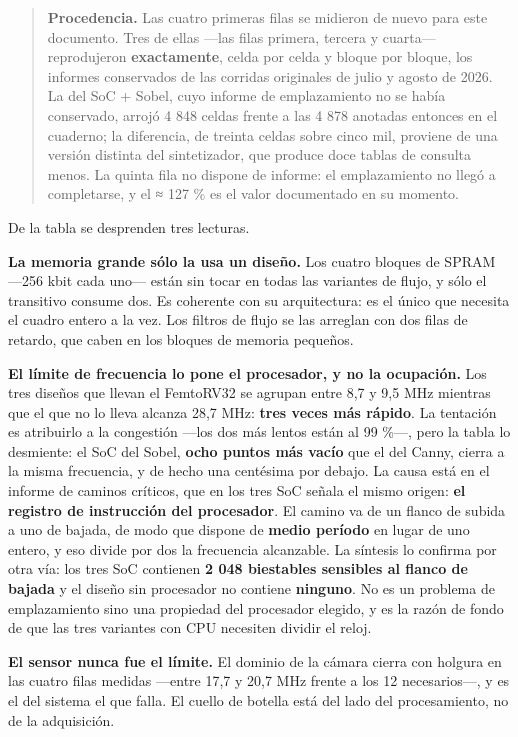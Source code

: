 \begin{quote}
\textbf{Procedencia.} Las cuatro primeras filas se midieron de nuevo
para este documento. Tres de ellas ---las filas primera, tercera y
cuarta--- reprodujeron \textbf{exactamente}, celda por celda y bloque
por bloque, los informes conservados de las corridas originales de julio
y agosto de 2026. La del SoC + Sobel, cuyo informe de emplazamiento no
se había conservado, arrojó 4 848 celdas frente a las 4 878 anotadas
entonces en el cuaderno; la diferencia, de treinta celdas sobre cinco
mil, proviene de una versión distinta del sintetizador, que produce doce
tablas de consulta menos. La quinta fila no dispone de informe: el
emplazamiento no llegó a completarse, y el ≈ 127 \% es el valor
documentado en su momento.
\end{quote}

De la tabla se desprenden tres lecturas.

\textbf{La memoria grande sólo la usa un diseño.} Los cuatro bloques de
SPRAM ---256 kbit cada uno--- están sin tocar en todas las variantes de
flujo, y sólo el transitivo consume dos. Es coherente con su
arquitectura: es el único que necesita el cuadro entero a la vez. Los
filtros de flujo se las arreglan con dos filas de retardo, que caben en
los bloques de memoria pequeños.

\textbf{El límite de frecuencia lo pone el procesador, y no la
ocupación.} Los tres diseños que llevan el FemtoRV32 se agrupan entre
8,7 y 9,5 MHz mientras que el que no lo lleva alcanza 28,7 MHz:
\textbf{tres veces más rápido}. La tentación es atribuirlo a la
congestión ---los dos más lentos están al 99 \%---, pero la tabla lo
desmiente: el SoC del Sobel, \textbf{ocho puntos más vacío} que el del
Canny, cierra a la misma frecuencia, y de hecho una centésima por
debajo. La causa está en el informe de caminos críticos, que en los tres
SoC señala el mismo origen: \textbf{el registro de instrucción del
procesador}. El camino va de un flanco de subida a uno de bajada, de
modo que dispone de \textbf{medio período} en lugar de uno entero, y eso
divide por dos la frecuencia alcanzable. La síntesis lo confirma por
otra vía: los tres SoC contienen \textbf{2 048 biestables sensibles al
flanco de bajada} y el diseño sin procesador no contiene
\textbf{ninguno}. No es un problema de emplazamiento sino una propiedad
del procesador elegido, y es la razón de fondo de que las tres variantes
con CPU necesiten dividir el reloj.

\textbf{El sensor nunca fue el límite.} El dominio de la cámara cierra
con holgura en las cuatro filas medidas ---entre 17,7 y 20,7 MHz frente
a los 12 necesarios---, y es el del sistema el que falla. El cuello de
botella está del lado del procesamiento, no de la adquisición.

